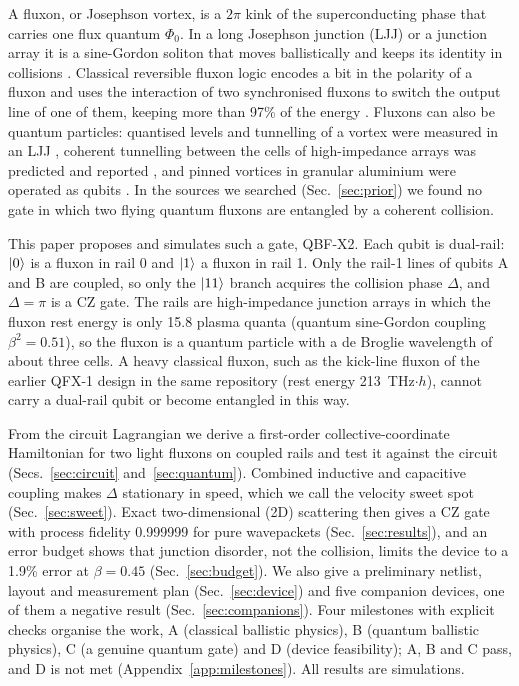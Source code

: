 \documentclass[10pt,twocolumn,letterpaper]{article}
\begin{document}
A fluxon, or Josephson vortex, is a $2\pi$ kink of the superconducting phase that carries one flux quantum $\Phi_0$.
In a long Josephson junction (LJJ) or a junction array it is a sine-Gordon soliton that moves ballistically and keeps
its identity in collisions \cite{Ustinov1998}. Classical reversible fluxon logic encodes a bit in the polarity of a
fluxon and uses the interaction of two synchronised fluxons to switch the output line of one of them, keeping more than
97\% of the energy \cite{WustmannOsborn2020,Osborn2017}. Fluxons can also be quantum particles: quantised levels and
tunnelling of a vortex were measured in an LJJ \cite{Wallraff2003}, coherent tunnelling between the cells of
high-impedance arrays was predicted \cite{SeidovFistul2021} and reported \cite{Wildermuth2023}, and pinned vortices in
granular aluminium were operated as qubits \cite{Nambisan2026}. In the sources we searched (Sec.~\ref{sec:prior}) we
found no gate in which two flying quantum fluxons are entangled by a coherent collision.

This paper proposes and simulates such a gate, QBF-X2. Each qubit is dual-rail: $\ket{0}$ is a fluxon in rail 0 and
$\ket{1}$ a fluxon in rail 1. Only the rail-1 lines of qubits A and B are coupled, so only the $\ket{11}$ branch
acquires the collision phase $\Delta$, and $\Delta=\pi$ is a CZ gate. The rails are high-impedance junction arrays in
which the fluxon rest energy is only 15.8 plasma quanta (quantum sine-Gordon coupling $\beta^2=0.51$), so the fluxon is
a quantum particle with a de Broglie wavelength of about three cells. A heavy classical fluxon, such as the kick-line
fluxon of the earlier QFX-1 design in the same repository (rest energy 213~THz$\cdot h$), cannot carry a dual-rail
qubit or become entangled in this way.

From the circuit Lagrangian we derive a first-order collective-coordinate Hamiltonian for two light fluxons on
coupled rails and test it against the circuit (Secs.~\ref{sec:circuit} and~\ref{sec:quantum}). Combined inductive and
capacitive coupling makes $\Delta$ stationary in speed, which we call the velocity sweet spot (Sec.~\ref{sec:sweet}).
Exact two-dimensional (2D) scattering then gives a CZ gate with process fidelity 0.999999 for pure wavepackets
(Sec.~\ref{sec:results}), and an error budget shows that junction disorder, not the collision, limits the device to a
1.9\% error at $\beta=0.45$ (Sec.~\ref{sec:budget}). We also give a preliminary netlist, layout and measurement plan
(Sec.~\ref{sec:device}) and five companion devices, one of them a negative result (Sec.~\ref{sec:companions}). Four
milestones with explicit checks organise the work, A (classical ballistic physics), B (quantum ballistic physics),
C (a genuine quantum gate) and D (device feasibility); A, B and C pass, and D is not met
(Appendix~\ref{app:milestones}). All results are simulations.
\end{document}

